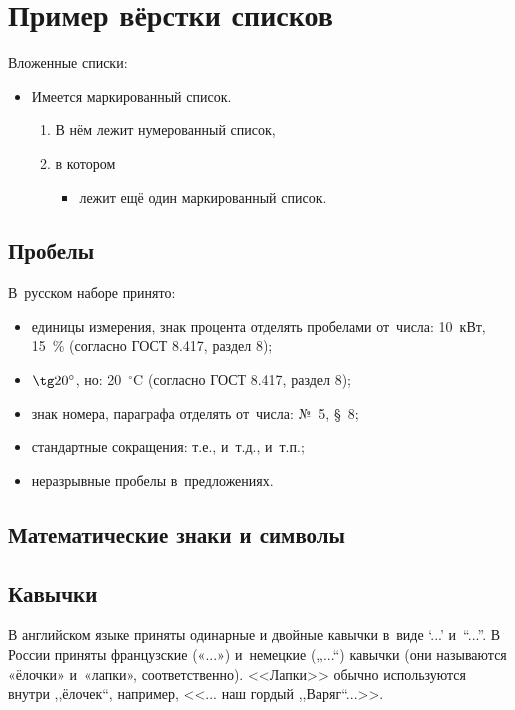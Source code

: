 \section{Пример вёрстки списков} \label{sect2_3}

\noindent Вложенные списки:
\begin{itemize}
  \item Имеется маркированный список.
  \begin{enumerate}
    \item В нём лежит нумерованный список,
    \item в котором
    \begin{itemize}
      \item лежит ещё один маркированный список.
    \end{itemize}
  \end{enumerate}
\end{itemize}


\subsection{Пробелы}

В~русском наборе принято:
\begin{itemize}
    \item единицы измерения, знак процента отделять пробелами от~числа: 10~кВт, 15~\% (согласно ГОСТ 8.417, раздел 8);
    \item $\tg 20^\circ$, но: 20~${}^\circ$C (согласно ГОСТ 8.417, раздел 8);
    \item знак номера, параграфа отделять от~числа: №~5, \S~8;
    \item стандартные сокращения: т.\:е., и~т.\:д., и~т.\:п.;
    \item неразрывные пробелы в~предложениях.
\end{itemize}

\subsection{Математические знаки и символы}


\subsection{Кавычки}
В английском языке приняты одинарные и двойные кавычки в~виде ‘...’ и~“...”. В России приняты французские («...») и~немецкие („...“) кавычки (они называются «ёлочки» и~«лапки», соответственно). <<Лапки>> обычно используются внутри ,,ёлочек``, например, <<... наш гордый ,,Варяг``...>>.

